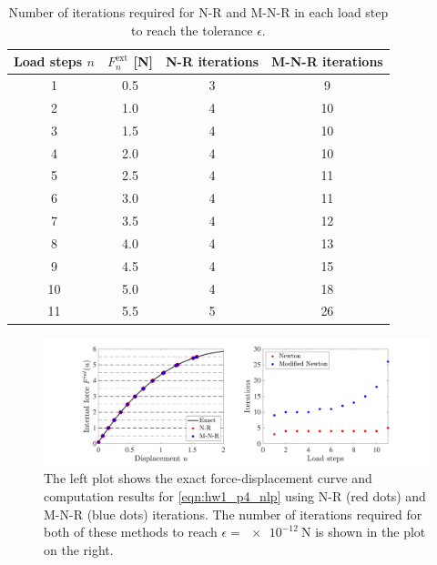 \begin{table}[!ht]
\centering
\begin{tabular}{|c|c|c|c|}
    \hline
    Load steps $n$ & $F^{\textrm{ext}}_n$ [\si{\newton}] & N-R iterations & M-N-R iterations \\
    \hline 
    1 & 0.5 & 3 & 9 \\ 
    \hline 
    2 & 1.0 & 4 & 10 \\ 
    \hline 
    3 & 1.5 & 4 & 10 \\ 
    \hline 
    4 & 2.0 & 4 & 10 \\ 
    \hline 
    5 & 2.5 & 4 & 11 \\ 
    \hline 
    6 & 3.0 & 4 & 11 \\ 
    \hline 
    7 & 3.5 & 4 & 12 \\ 
    \hline 
    8 & 4.0 & 4 & 13 \\ 
    \hline 
    9 & 4.5 & 4 & 15 \\ 
    \hline 
    10 & 5.0 & 4 & 18 \\ 
    \hline 
    11 & 5.5 & 5 & 26 \\ 
    \hline
\end{tabular}
\caption{Number of iterations required for N-R and M-N-R in each load step to reach the tolerance $\epsilon$. }
\label{tab:hw1_p4_iters}
\end{table}
\begin{figure}[!ht]
    \centering
    \includegraphics[width=\linewidth]{homework/hw1/hw1_p4.pdf}
    \caption{The left plot shows the exact force-displacement curve and computation results for \cref{eqn:hw1_p4_nlp} using N-R (red dots) and M-N-R (blue dots) iterations.
    The number of iterations required for both of these methods to reach $\epsilon = \qty{e-12}{\newton}$ is shown in the plot on the right. 
    }
    \label{fig:hw1_p4_fd}
\end{figure}


